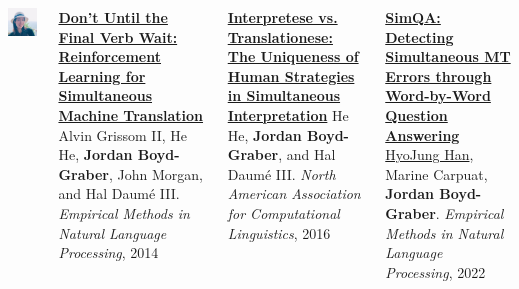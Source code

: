 \documentclass[compress]{beamer}
\begin{document}
\begin{frame}{}
\begin{columns}
\begin{center}
        \includegraphics[width=0.8\linewidth]{general_figures/hyojung}
        \end{center}

        \begin{block}{ {\bf
              \href{http://umiacs.umd.edu/~jbg//docs/2014_emnlp_simtrans.pdf}{Don’t Until the Final Verb Wait: Reinforcement Learning for Simultaneous Machine Translation}}}
          \small
Alvin Grissom II, He He, {\bf Jordan Boyd-Graber}, John Morgan, and Hal {Daum\'{e} III}.  \emph{Empirical Methods in Natural Language Processing}, 2014
        \end{block}

        \begin{block}{ {\bf
              \href{http://umiacs.umd.edu/~jbg/docs/2016_naacl_interpretese.pdf}{Interpretese
                vs. Translationese: The Uniqueness of Human Strategies
                in Simultaneous Interpretation}}}
          \small
He He, {\bf Jordan Boyd-Graber}, and Hal {Daum\'{e} III}.
\emph{North American Association for Computational Linguistics}, 2016
        \end{block}


        \begin{block}{ {\bf
              \href{http://umiacs.umd.edu/~jbg/docs/2022_emnlp_simint.pdf}{SimQA:
                Detecting Simultaneous MT Errors through 
                Word-by-Word Question Answering}}}
          \small
          \href{https://h-j-han.github.io/}{HyoJung Han}, Marine
            Carpuat, {\bf Jordan Boyd-Graber}.  \emph{Empirical Methods in Natural Language Processing}, 2022
          
          \end{block}
  \end{columns}


\end{frame}
\end{document}
